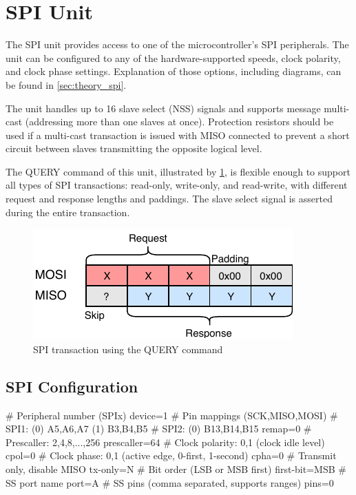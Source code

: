 \section{SPI Unit}

The \gls{SPI} unit provides access to one of the microcontroller's \gls{SPI} peripherals. The unit can be configured to any of the hardware-supported speeds, clock polarity, and clock phase settings. Explanation of those options, including diagrams, can be found in \cref{sec:theory_spi}.

The unit handles up to 16 slave select (\gls{NSS}) signals and supports message multi-cast (addressing more than one slaves at once). Protection resistors should be used if a multi-cast transaction is issued with \gls{MISO} connected to prevent a short circuit between slaves transmitting the opposite logical level.

The QUERY command of this unit, illustrated by \cref{fig:spi_query}, is flexible enough to support all types of \gls{SPI} transactions: read-only, write-only, and read-write, with different request and response lengths and paddings. The slave select signal is asserted during the entire transaction.

\begin{figure}[h]
	\centering
	\includegraphics[scale=1.1] {img/spi-query.pdf}
	\caption{\label{fig:spi_query}SPI transaction using the QUERY command}
\end{figure}

\subsection{SPI Configuration}

\begin{inicode}
# Peripheral number (SPIx)
device=1
# Pin mappings (SCK,MISO,MOSI)
#  SPI1: (0) A5,A6,A7     (1) B3,B4,B5
#  SPI2: (0) B13,B14,B15
remap=0
# Prescaller: 2,4,8,...,256
prescaller=64
# Clock polarity: 0,1 (clock idle level)
cpol=0
# Clock phase: 0,1 (active edge, 0-first, 1-second)
cpha=0
# Transmit only, disable MISO
tx-only=N
# Bit order (LSB or MSB first)
first-bit=MSB
# SS port name
port=A
# SS pins (comma separated, supports ranges)
pins=0
\end{inicode}

